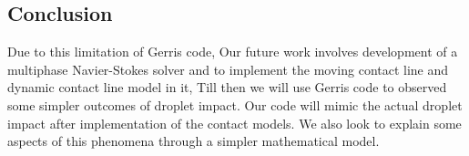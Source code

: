 \subsection{Conclusion}
Due to this limitation of Gerris code, Our future work involves development of a multiphase Navier-Stokes solver and to implement the moving contact line and dynamic contact line model in it, 
Till then we will use Gerris code to observed some simpler outcomes of droplet impact. Our code will mimic the actual droplet impact after implementation of the contact models. We also
look to explain some aspects of this phenomena through a simpler mathematical model.

